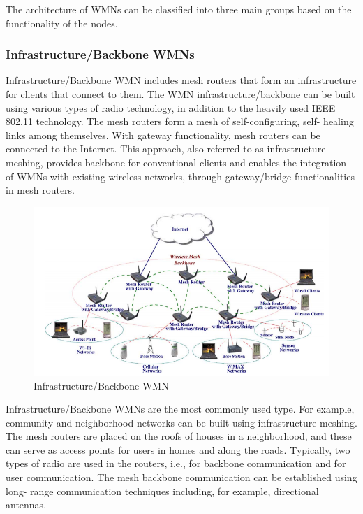 \documentclass[12pt,a4paper]{report}
\begin{document}
The architecture of WMNs can be classified into three main groups based on the
functionality of the nodes.

\subsubsection{Infrastructure/Backbone WMNs}
Infrastructure/Backbone WMN includes mesh routers that form
an infrastructure for clients that connect to them. The WMN infrastructure/backbone can be built using various types of radio technology, in addition to the heavily used
IEEE 802.11 technology. The mesh routers form a mesh of self-configuring, self-
healing links among themselves. With gateway functionality, mesh routers can be
connected to the Internet. This approach, also referred to as infrastructure meshing,
provides backbone for conventional clients and enables the integration of WMNs
with existing wireless networks, through gateway/bridge functionalities in mesh
routers.
\begin{figure}[hbtp]
\centering
\includegraphics[scale=0.75]{infrastructure-mesh-clear.png}
\caption{Infrastructure/Backbone WMN}
\end{figure}

Infrastructure/Backbone WMNs are the most commonly used type. For example,
community and neighborhood networks can be built using infrastructure meshing.
The mesh routers are placed on the roofs of houses in a neighborhood, and these
can serve as access points for users in homes and along the roads. Typically, two
types of radio are used in the routers, i.e., for backbone communication and for user
communication. The mesh backbone communication can be established using long-
range communication techniques including, for example, directional antennas.
\end{document}
